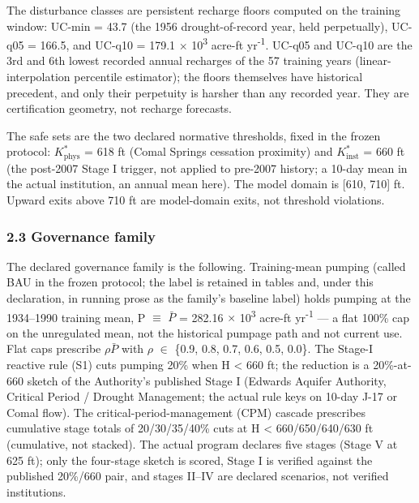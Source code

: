 The disturbance classes are persistent recharge floors computed on the
training window: UC-min = 43.7 (the 1956 drought-of-record year, held
perpetually), UC-q05 = 166.5, and UC-q10 = 179.1 \ensuremath{\times} 10\textsuperscript{3} acre-ft yr\textsuperscript{-1}.
UC-q05 and UC-q10 are the 3rd and 6th lowest recorded annual recharges
of the 57 training years (linear-interpolation percentile estimator);
the floors themselves have historical precedent, and only their
perpetuity is harsher than any recorded year. They are certification
geometry, not recharge forecasts.

The safe sets are the two declared normative thresholds, fixed in the
frozen protocol: \(K^{\ast}_{\mathrm{phys}}\) = 618 ft (Comal Springs
cessation proximity) and \(K^{\ast}_{\mathrm{inst}}\) = 660 ft (the
post-2007 Stage I trigger, not applied to pre-2007 history; a 10-day
mean in the actual institution, an annual mean here). The model domain
is {[}610, 710{]} ft. Upward exits above 710 ft are model-domain exits,
not threshold violations.

\subsubsection{2.3 Governance family}\label{edw-governance-family}

The declared governance family is the following. Training-mean pumping
(called BAU in the frozen protocol; the label is retained in tables and,
under this declaration, in running prose as the family's baseline label)
holds pumping at the 1934--1990 training mean, P \ensuremath{\equiv} \(\bar{P}\) = 282.16 \ensuremath{\times} 10\textsuperscript{3}
acre-ft yr\textsuperscript{-1} --- a flat 100\% cap on the unregulated mean, not the
historical pumpage path and not current use. Flat caps prescribe \ensuremath{\rho}\(\bar{P}\) with
\ensuremath{\rho} \ensuremath{\in} \{0.9, 0.8, 0.7, 0.6, 0.5, 0.0\}. The Stage-I reactive rule (S1)
cuts pumping 20\% when H \textless{} 660 ft; the reduction is a
20\%-at-660 sketch of the Authority's published Stage I (Edwards Aquifer
Authority, Critical Period / Drought Management; the actual rule keys on
10-day J-17 or Comal flow). The critical-period-management (CPM) cascade
prescribes cumulative stage totals of 20/30/35/40\% cuts at H
\textless{} 660/650/640/630 ft (cumulative, not stacked). The actual
program declares five stages (Stage V at 625 ft); only the four-stage
sketch is scored, Stage I is verified against the published 20\%/660
pair, and stages II--IV are declared scenarios, not verified
institutions.


